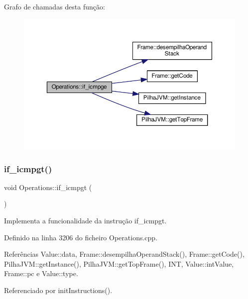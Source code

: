 Grafo de chamadas desta função\+:\nopagebreak
\begin{figure}[H]
\begin{center}
\leavevmode
\includegraphics[width=350pt]{classOperations_a147f088fabd19030a535ac68ff091be1_cgraph}
\end{center}
\end{figure}
\mbox{\label{classOperations_a40232532d2522ef0afe261555688a7fd}} 
\subsubsection{\texorpdfstring{if\+\_\+icmpgt()}{if\_icmpgt()}}
{\footnotesize\ttfamily void Operations\+::if\+\_\+icmpgt (\begin{DoxyParamCaption}{ }\end{DoxyParamCaption})\hspace{0.3cm}{\ttfamily [private]}}



Implementa a funcionalidade da instrução if\+\_\+icmpgt. 



Definido na linha 3206 do ficheiro Operations.\+cpp.



Referências Value\+::data, Frame\+::desempilha\+Operand\+Stack(), Frame\+::get\+Code(), Pilha\+J\+V\+M\+::get\+Instance(), Pilha\+J\+V\+M\+::get\+Top\+Frame(), I\+NT, Value\+::int\+Value, Frame\+::pc e Value\+::type.



Referenciado por init\+Instructions().

